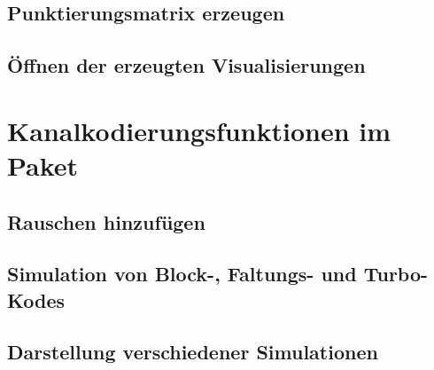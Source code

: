 \subsection{Punktierungsmatrix erzeugen}
\label{sec:interface_punctuation}

\newpage

\subsection{Öffnen der erzeugten Visualisierungen}
\label{sec:interface_openPDF}

\newpage

\section{Kanalkodierungsfunktionen im Paket}
\label{sec:interface_channelFunctions}

\subsection{Rauschen hinzufügen}
\label{sec:interface_applyNoise}


\subsection{Simulation von Block-, Faltungs- und Turbo-Kodes}
\label{sec:interface_channelcodingSimulation}


\subsection{Darstellung verschiedener Simulationen}
\label{sec:interface_plotSimulationData}
